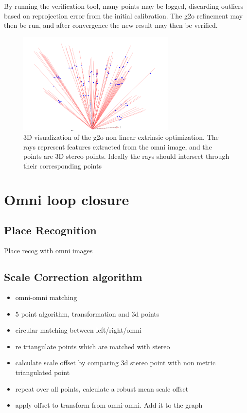 By running the verification tool, many points may be logged, discarding outliers based on reprojection error from the initial calibration.  The g2o refinement may then be run, and after convergence the new result may then be verified.

\begin{figure}[h!]
  \centering
    \includegraphics[width=0.7\textwidth]{chapters/images/g2o_cal_vis}
  \caption{3D visualization of the g2o non linear extrinsic optimization.  The rays represent features extracted from the omni image, and the points are 3D stereo points.  Ideally the rays should intersect through their corresponding points}
  \label{fig:g2o_cal_vis}
\end{figure}

\section{Omni loop closure}

\subsection{Place Recognition}

Place recog with omni images

\subsection{Scale Correction algorithm}

\begin{itemize}
\itemsep0em
 \item omni-omni matching
 \item 5 point algorithm, transformation and 3d points
 \item circular matching between left/right/omni
 \item re triangulate points which are matched with stereo
 \item calculate scale offset by comparing 3d stereo point with non metric triangulated point
 \item repeat over all points, calculate a robust mean scale offset
 \item apply offset to transform from omni-omni. Add it to the graph
\end{itemize}


